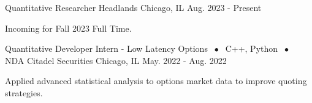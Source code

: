 

\begin{cventries}


  \cventry
    {Quantitative Researcher} %
    {Headlands} %
    {Chicago, IL} %
    {Aug. 2023 - Present} %
    {
      \begin{cvitems}
      \item Incoming for Fall 2023 Full Time.
      \end{cvitems}
    }

  \cventry
    {Quantitative Developer Intern - Low Latency Options $\;\bullet\;$ C++, Python $\;\bullet\;$ NDA} %
    {Citadel Securities} %
    {Chicago, IL} %
    {May. 2022 - Aug. 2022} %
    {
      \begin{cvitems}
      \item Applied advanced statistical analysis to options market data to improve quoting strategies.
      \end{cvitems}
    }


\end{cventries}
